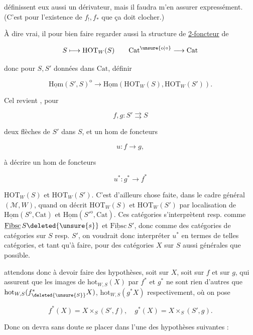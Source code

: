 définissent eux aussi un dérivateur, mais il faudra m'en assurer expressément. (C'est pour l'existence de $f_!,f_*$ que ça doit clocher.)

À dire vrai,  il  pour bien faire regarder aussi la structure de \uline{2-foncteur} de

\[
S\longmapsto\mathrm{HOT}_W(S)\qquad \mathrm{Cat}^{\unsure{\mathrm o|\circ}}\longrightarrow\mathrm{Cat}
\]

donc pour $S,S'$ données dans $\mathrm{Cat}$, définir

\[
\underline{\mathrm{Hom}}(S',S)^{\mathrm o}\longrightarrow
\underline{\mathrm{Hom}}(\mathrm{HOT}_W(S),\mathrm{HOT}_W(S')).
\]

Cel revient , pour

\[
 f,g:S'\rightrightarrows S
\]

deux flèches de $S'$ dans $S$, et un hom de foncteurs

\[
u:f\longrightarrow g,
\]

à décrire un hom de foncteurs

\[
u^*:g^*\longrightarrow f^*
\]

 $\mathrm{HOT}_W(S)$ et $\mathrm{HOT}_W(S')$. C'est d'ailleurs chose faite, dans le cadre général  $(\mathcal M,W)$, quand on décrit $\mathrm{HOT}_{W}(S)$ et $\mathrm{HOT}_W(S')$ par localisation de $\underline{\mathrm{Hom}}(S^{\mathrm o},\mathrm{Cat})$ et $\underline{\mathrm{Hom}}(S'^{\mathrm o},\mathrm{Cat})$. Ces catégories s'interprètent resp. comme $\underline{\mathrm{Fibsc}}\,S\deleted{\unsure{s}}$ et $\underline{\mathrm{Fibsc}}\,S'$, donc comme des catégories de catégories sur $S$ resp. $S'$, on voudrait donc interpréter $u^*$ en termes de telles catégories, et tant qu'à faire, pour des catégories $X$ sur $S$ aussi générales que possible.  

attendons donc à devoir faire des hypothèses, soit sur $X$, soit sur $f$ et sur $g$, qui assurent que les images de $\mathrm{hot}_{W,S}(X)$ par $f^*$ et $g^*$ ne sont rien d'autres que $\mathrm{hot}_{W,S}(f^*_{\deleted{\unsure{S}}}X)$, $\mathrm{hot}_{W,S}(g^*X)$ respectivement, où on pose

\[
f^*(X)=X\times_S(S',f),\quad g^*(X)=X\times_S(S',g).
\]

Donc on  devra sans doute se placer dans l'une des hypothèses suivantes :


